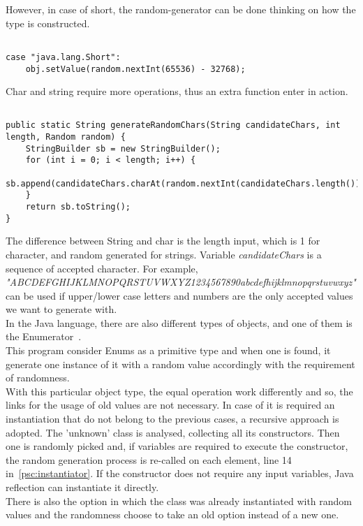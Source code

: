 However, in case of short, the random-generator can be done thinking on how the type is constructed.
\begin{lstlisting}[caption={Random short generator},label={lst:genShort}]% Start your code-block
	
case "java.lang.Short":
	obj.setValue(random.nextInt(65536) - 32768);
\end{lstlisting}
Char and string require more operations, thus an extra function enter in action.
\begin{lstlisting}[caption={Random String/char generator},label={lst:genString&Char}]% Start your code-block

public static String generateRandomChars(String candidateChars, int length, Random random) {
	StringBuilder sb = new StringBuilder();
	for (int i = 0; i < length; i++) {
		sb.append(candidateChars.charAt(random.nextInt(candidateChars.length())));
	}
	return sb.toString();
}
\end{lstlisting}
The difference between String and char is the length input, which is 1 for character, and random generated for strings.
Variable \emph{candidateChars} is a sequence of accepted character. 
For example, \emph{"ABCDEFGHIJKLMNOPQRSTUVWXYZ1234567890abcdefhijklmnopqrstuvwxyz"} can be used if upper/lower case letters and numbers are the only accepted values we want to generate with.\\
In the Java language, there are also different types of objects, and one of them is the Enumerator~\cite{enum}.\\
This program consider Enums as a primitive type and when one is found, it generate one instance of it with a random value accordingly with the requirement of randomness.\\
With this particular object type, the equal operation work differently and so, the links for the usage of old values are not necessary. 
In case of it is required an instantiation that do not belong to the previous cases, a recursive approach is adopted.
The 'unknown' class is analysed, collecting all its constructors.
Then one is randomly picked and, if variables are required to execute the constructor, the random generation process is re-called on each element, line 14 in~\ref{psc:instantiator}.
If the constructor does not require any input variables, Java reflection can instantiate it directly.\\
There is also the option in which the class was already instantiated with random values and the randomness choose to take an old option instead of a new one.
